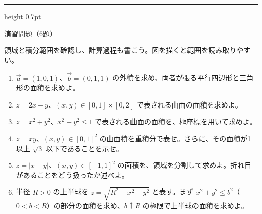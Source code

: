 \documentclass[a4paper,10pt,pdflatex,ja=standard,jafont=ipaex-type1,
  magstyle=real,scale=1]{bxjsarticle}
\newcommand{\topic}[1]{\par\vspace{5pt}%
  {\large\sffamily\mdseries\color{accent}#1}\par\vspace{2pt}}
\newenvironment{problems}
  {\begin{enumerate}[leftmargin=2em,itemsep=3pt,topsep=3pt,parsep=0pt,
    font=\color{accent}]}
  {\end{enumerate}}
\newcommand{\problemspace}{\par\vspace{5mm}}
\newcommand{\exercises}{%
  {\color{accent}\hrule height 0.7pt}\vspace{3pt}%
  \topic{演習問題（6題）}%
  {\small 領域と積分範囲を確認し、計算過程も書こう。図を描くと範囲を読み取りやすい。}\par}
\begin{document}
\noindent\begin{minipage}[b][0.5\textheight][t]{\linewidth}
\exercises
\begin{problems}
\item $\vec a=(1,0,1)$、$\vec b=(0,1,1)$ の外積を求め、両者が張る平行四辺形と三角形の面積を求めよ。
\problemspace

\item $z=2x-y$、$(x,y)\in[0,1]\times[0,2]$ で表される曲面の面積を求めよ。
\problemspace

\item $z=x^2+y^2$、$x^2+y^2\le1$ で表される曲面の面積を、極座標を用いて求めよ。
\problemspace

\item $z=xy$、$(x,y)\in[0,1]^2$ の曲面積を重積分で表せ。さらに、その面積が1以上 $\sqrt3$ 以下であることを示せ。
\problemspace

\item $z=|x+y|$、$(x,y)\in[-1,1]^2$ の面積を、領域を分割して求めよ。折れ目があることをどう扱ったか述べよ。
\problemspace

\item 半径 $R>0$ の上半球を $z=\sqrt{R^2-x^2-y^2}$ と表す。まず $x^2+y^2\le b^2$（$0<b<R$）の部分の面積を求め、$b\uparrow R$ の極限で上半球の面積を求めよ。
\problemspace
\end{problems}
\end{minipage}
\end{document}
